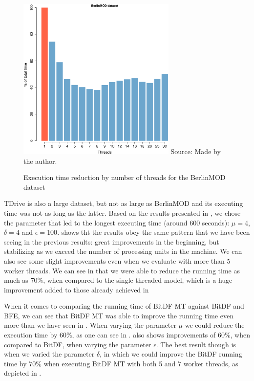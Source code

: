 {\begin{figure}[h!]
    \centering
    \caption{Execution time reduction by number of threads for the BerlinMOD dataset}
    \includegraphics[width=0.7\textwidth]{images/BerlinMOD_thread.eps}
    \footnotesize{Source: Made by the author.}
    \label{fig:berlinmod_threads}
\end{figure}

TDrive is also a large dataset, but not as large as BerlinMOD and its executing time was not as long as the latter.
Based on the results presented in , we chose the parameter that led to the longest executing time
(around 600 seconds): $\mu=4$, $\delta=4$ and $\epsilon=100$.  shows tht the results obey the
same pattern that we have been seeing in the previous results: great improvements in the beginning, but stabilizing as
we exceed the number of processing units in the machine. We can also see some slight improvements even when we evaluate
with more than 5 worker threads. We can see in  that we were able to reduce the running time
as much as 70\%, when compared to the single threaded model, which is a huge improvement added to those already achieved
in 

When it comes to comparing the running time of BitDF MT against BitDF and BFE, we can see that BitDF MT was able to
improve the running time even more than we have seen in . When varying the parameter $\mu$ we could
reduce the execution time by 60\%, as one can see in .
 also shows improvements of 60\%, when compared to BitDF, when varying the parameter
$\epsilon$. The best result though is when we varied the parameter $\delta$, in which we could improve the BitDF running
time by 70\% when executing BitDF MT with both 5 and 7 worker threads, as depicted in
.

}
